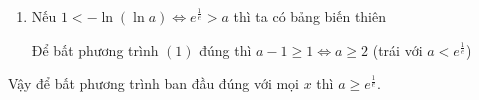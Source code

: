 \begin{bt}
{\begin{enumerate}
			\begin{center}
			\end{center}
			Để bất phương trình $(1)$ đúng thì $\dfrac{1}{a}+1 \geq 1 \Leftrightarrow a \geq 0$. Do đó $a>e^e$.
			\item Nếu $1 < -\ln (\ln a) \Leftrightarrow e^{\frac{1}{e}}>a$ thì ta có bảng biến thiên
			\begin{center}
			\end{center}
			Để bất phương trình $(1)$ đúng thì $a-1 \geq 1 \Leftrightarrow a\geq 2$ (trái với $a<e^{\frac{1}{e}}$)
		\end{enumerate}
		Vậy để bất phương trình ban đầu đúng với mọi $x$ thì $a\geq e^{\frac{1}{e}}$.}
\end{bt}

